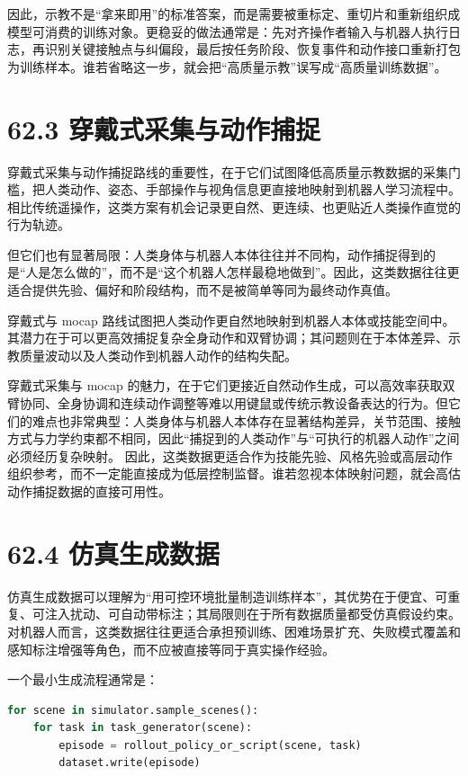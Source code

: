 因此，示教不是“拿来即用”的标准答案，而是需要被重标定、重切片和重新组织成模型可消费的训练对象。更稳妥的做法通常是：先对齐操作者输入与机器人执行日志，再识别关键接触点与纠偏段，最后按任务阶段、恢复事件和动作接口重新打包为训练样本。谁若省略这一步，就会把“高质量示教”误写成“高质量训练数据”。

\section*{62.3 穿戴式采集与动作捕捉}


穿戴式采集与动作捕捉路线的重要性，在于它们试图降低高质量示教数据的采集门槛，把人类动作、姿态、手部操作与视角信息更直接地映射到机器人学习流程中。相比传统遥操作，这类方案有机会记录更自然、更连续、也更贴近人类操作直觉的行为轨迹。

但它们也有显著局限：人类身体与机器人本体往往并不同构，动作捕捉得到的是“人是怎么做的”，而不是“这个机器人怎样最稳地做到”。因此，这类数据往往更适合提供先验、偏好和阶段结构，而不是被简单等同为最终动作真值。

穿戴式与 mocap 路线试图把人类动作更自然地映射到机器人本体或技能空间中。其潜力在于可以更高效捕捉复杂全身动作和双臂协调；其问题则在于本体差异、示教质量波动以及人类动作到机器人动作的结构失配。

穿戴式采集与 mocap 的魅力，在于它们更接近自然动作生成，可以高效率获取双臂协同、全身协调和连续动作调整等难以用键鼠或传统示教设备表达的行为。但它们的难点也非常典型：人类身体与机器人本体存在显著结构差异，关节范围、接触方式与力学约束都不相同，因此“捕捉到的人类动作”与“可执行的机器人动作”之间必须经历复杂映射。 因此，这类数据更适合作为技能先验、风格先验或高层动作组织参考，而不一定能直接成为低层控制监督。谁若忽视本体映射问题，就会高估动作捕捉数据的直接可用性。

\section*{62.4 仿真生成数据}


仿真生成数据可以理解为“用可控环境批量制造训练样本”，其优势在于便宜、可重复、可注入扰动、可自动带标注；其局限则在于所有数据质量都受仿真假设约束。对机器人而言，这类数据往往更适合承担预训练、困难场景扩充、失败模式覆盖和感知标注增强等角色，而不应被直接等同于真实操作经验。

一个最小生成流程通常是：

\begin{lstlisting}[language=python]
for scene in simulator.sample_scenes():
    for task in task_generator(scene):
        episode = rollout_policy_or_script(scene, task)
        dataset.write(episode)
\end{lstlisting}

